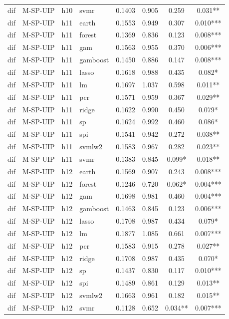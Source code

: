 \begin{ThreePartTable}
\begin{longtable}[t]{llclcccc}
dif & M-SP-UIP & h10 & svmr & 0.1403 & 0.905 & 0.259 & 0.031**\\
\addlinespace
dif & M-SP-UIP & h11 & earth & 0.1553 & 0.949 & 0.307 & 0.010***\\
dif & M-SP-UIP & h11 & forest & 0.1369 & 0.836 & 0.123 & 0.008***\\
dif & M-SP-UIP & h11 & gam & 0.1563 & 0.955 & 0.370 & 0.006***\\
dif & M-SP-UIP & h11 & gamboost & 0.1450 & 0.886 & 0.147 & 0.008***\\
dif & M-SP-UIP & h11 & lasso & 0.1618 & 0.988 & 0.435 & 0.082*\\
dif & M-SP-UIP & h11 & lm & 0.1697 & 1.037 & 0.598 & 0.011**\\
dif & M-SP-UIP & h11 & pcr & 0.1571 & 0.959 & 0.367 & 0.029**\\
dif & M-SP-UIP & h11 & ridge & 0.1622 & 0.990 & 0.450 & 0.079*\\
dif & M-SP-UIP & h11 & sp & 0.1624 & 0.992 & 0.460 & 0.086*\\
dif & M-SP-UIP & h11 & spi & 0.1541 & 0.942 & 0.272 & 0.038**\\
dif & M-SP-UIP & h11 & svmlw2 & 0.1583 & 0.967 & 0.282 & 0.023**\\
dif & M-SP-UIP & h11 & svmr & 0.1383 & 0.845 & 0.099* & 0.018**\\
\addlinespace
dif & M-SP-UIP & h12 & earth & 0.1569 & 0.907 & 0.243 & 0.008***\\
dif & M-SP-UIP & h12 & forest & 0.1246 & 0.720 & 0.062* & 0.004***\\
dif & M-SP-UIP & h12 & gam & 0.1698 & 0.981 & 0.460 & 0.004***\\
dif & M-SP-UIP & h12 & gamboost & 0.1463 & 0.845 & 0.123 & 0.006***\\
dif & M-SP-UIP & h12 & lasso & 0.1708 & 0.987 & 0.434 & 0.079*\\
dif & M-SP-UIP & h12 & lm & 0.1877 & 1.085 & 0.661 & 0.007***\\
dif & M-SP-UIP & h12 & pcr & 0.1583 & 0.915 & 0.278 & 0.027**\\
dif & M-SP-UIP & h12 & ridge & 0.1708 & 0.987 & 0.435 & 0.070*\\
dif & M-SP-UIP & h12 & sp & 0.1437 & 0.830 & 0.117 & 0.010***\\
dif & M-SP-UIP & h12 & spi & 0.1489 & 0.861 & 0.129 & 0.013**\\
dif & M-SP-UIP & h12 & svmlw2 & 0.1663 & 0.961 & 0.182 & 0.015**\\
dif & M-SP-UIP & h12 & svmr & 0.1128 & 0.652 & 0.034** & 0.007***\\

\end{longtable}
\end{ThreePartTable}
